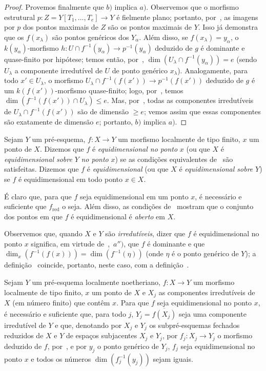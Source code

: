 \begin{proof}
Provemos finalmente que $b)$ implica $a)$.
Observemos que o morfismo estrutural $p:Z=Y[T_1,\ldots,T_e]\to Y$ é fielmente
plano; portanto, por~, as imagens por $p$ dos pontos maximais
de $Z$ são os pontos maximais de $Y$.
Isso já demonstra que os $f(x_\lambda)$ são pontos genéricos dos $Y_\alpha$.
Além disso, se $f(x_\lambda)=y_\alpha$, o $k(y_\alpha)$-morfismo
$h:U\cap f^{-1}(y_\alpha)\to p^{-1}(y_\alpha)$ deduzido de $g$ é dominante
e quase-finito por hipótese; temos então, por~,
$\dim(U_\lambda\cap f^{-1}(y_\alpha))=e$ (sendo $U_\lambda$ a componente
irredutível de $U$ de ponto genérico $x_\lambda$).
Analogamente, para todo $x'\in U_\lambda$, o morfismo
$U_\lambda\cap f^{-1}(f(x'))\to p^{-1}(f(x'))$ deduzido de $g$ é um
$k(f(x'))$-morfismo quase-finito; logo, por~, temos
$\dim(f^{-1}(f(x'))\cap U_\lambda)\leq e$.
Mas, por~, todas as componentes irredutíveis de
$U_\lambda\cap f^{-1}(f(x'))$ são de dimensão $\geq e$; vemos assim que
essas componentes são exatamente de dimensão $e$; portanto, $b)$ implica $a)$.
\end{proof}

\begin{definition}[13.3.2]
\label{IV.13.3.2}
Sejam $Y$ um pré-esquema, $f:X\to Y$ um morfismo localmente de tipo finito,
$x$ um ponto de $X$.
Dizemos que $f$ é \emph{equidimensional no ponto} $x$ (ou que $X$ é
\emph{equidimensional sobre} $Y$ \emph{no ponto} $x$) se as condições
equivalentes de~ são satisfeitas.
Dizemos que $f$ é \emph{equidimensional} (ou que $X$ é
\emph{equidimensional sobre} $Y$) se $f$ é equidimensional em todo
ponto $x\in X$.
\end{definition}

É claro que, para que $f$ seja equidimensional em um ponto $x$, é necessário
e suficiente que $f_{\mathrm{red}}$ o seja.
Além disso, as condições de~ mostram que o conjunto dos
pontos em que $f$ é equidimensional é \emph{aberto} em $X$.

Observemos que, quando $X$ e $Y$ são \emph{irredutíveis}, dizer que $f$ é
equidimensional no ponto $x$ significa, em virtude de~,~$a'')$,
que $f$ é dominante e que
$\dim_x(f^{-1}(f(x)))=\dim(f^{-1}(\eta))$ (onde $\eta$ é o ponto genérico
de $Y$); a definição~ coincide, portanto, neste caso, com
a definição~.

\begin{proposition}[13.3.3]
\label{IV.13.3.3}
Sejam $Y$ um pré-esquema localmente noetheriano,
$f:X\to Y$ um morfismo localmente de tipo finito, $x$ um ponto de $X$
e $X_j$ as componentes irredutíveis de $X$ (em número finito) que contêm $x$.
Para que $f$ seja equidimensional no ponto $x$, é necessário e suficiente
que, para todo $j$, $Y_j=\overline{f(X_j)}$ seja uma componente irredutível
de $Y$ e que, denotando por $X_j$ e $Y_j$ os subpré-esquemas fechados
reduzidos de $X$ e $Y$ de espaços subjacentes $X_j$ e $Y_j$, por
$f_j:X_j\to Y_j$ o morfismo deduzido de $f$, por~,
e por $y_j$ o ponto genérico de $Y_j$, $f_j$ seja equidimensional no ponto
$x$ e todos os números $\dim(f_j^{-1}(y_j))$ sejam iguais.
\end{proposition}

